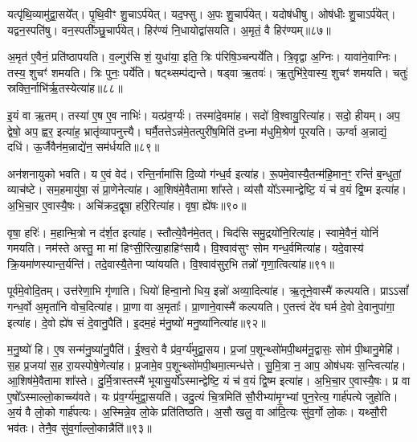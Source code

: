 यत्पृ॑थि॒व्यामु॑द्वा॒सये᳚त्। 
पृ॒थि॒वीꣳ शु॒चाऽर्प॑येत्। 
यद॒फ्सु। 
अ॒पः  शु॒चार्प॑येत्। 
यदोष॑धीषु। 
ओष॑धीः  शु॒चाऽर्प॑येत्। 
यद्वन॒स्पति॑षु। 
वन॒स्पती᳚ञ्छु॒चार्प॑येत्। 
हिर॑ण्यं नि॒धायोद्वा॑सयति। 
अ॒मृतं॒ वै हिर॑ण्यम्॥८७॥

अ॒मृत॑ ए॒वैनं॒ प्रति॑ष्ठापयति। 
व॒ल्गुर॑सि शं॒ युधा॑या॒ इति॒ त्रिः प॑रिषि॒ञ्चन्पर्ये॑ति। 
त्रि॒वृद्वा अ॒ग्निः। 
यावा॑ने॒वाग्निः। 
तस्य॒ शुचꣳ॑ शमयति। 
त्रिः पुनः॒ पर्ये॑ति। 
षट्थ्सम्प॑द्यन्ते। 
षड्वा ऋ॒तवः॑। 
ऋ॒तुभि॑रे॒वास्य॒ शुचꣳ॑ शमयति। 
चतुः॑ स्रक्ति॒र्नाभि॑र्\mbox{}ऋ॒तस्येत्या॑ह॥८८॥

इ॒यं वा ऋ॒तम्। 
तस्या॑ ए॒ष ए॒व नाभिः॑। 
यत्प्र॑व॒र्ग्यः॑। 
तस्मा॑दे॒वमा॑ह। 
सदो॑ वि॒श्वायु॒रित्या॑ह। 
सदो॒ हीयम्। 
अप॒ द्वेषो॒ अप॒ ह्वर॒ इत्या॑ह॒ भ्रातृ॑व्यापनुत्त्यै। 
घर्मै॒तत्तेऽन्न॑मे॒तत्पुरी॑ष॒मिति॑ द॒ध्ना म॑धुमि॒श्रेण॑ पूरयति। 
ऊर्ग्वा अ॒न्नाद्यं॒ दधि॑। 
ऊ॒र्जैवैन॑म॒न्नाद्ये॑न॒ सम॑र्धयति॥८९॥

अन॑शनायुको भवति। 
य ए॒वं वेद॑। 
रन्ति॒र्नामा॑सि दि॒व्यो ग॑न्ध॒र्व इत्या॑ह। 
रू॒पमे॒वास्यै॒तन्म॑हि॒मान॒ꣳ॒ रन्तिं॑ ब॒न्धुतां॒ व्याच॑ष्टे। 
सम॒हमायु॑षा॒ सं प्रा॒णेनेत्या॑ह। 
आ॒शिष॑मे॒वैतामा शा᳚स्ते। 
व्य॑सौ यो᳚ऽस्मान्द्वेष्टि॒ यं च॑ व॒यं द्वि॒ष्म इत्या॑ह। 
अ॒भि॒चा॒र ए॒वास्यै॒षः। 
अचि॑क्रद॒द्वृषा॒ हरि॒रित्या॑ह। 
वृषा॒ ह्ये॑षः॥९०॥

वृषा॒ हरिः॑। 
म॒हान्मि॒त्रो न द॑र्\mbox{}श॒त इत्या॑ह। 
स्तौत्ये॒वैन॑मे॒तत्। 
चिद॑सि समु॒द्रयो॑नि॒रित्या॑ह। 
स्वामे॒वैनं॒ योनिं॑ गमयति। 
नम॑स्ते अस्तु॒ मा मा॑ हिꣳसी॒रित्या॒हाहिꣳ॑सायै। 
वि॒श्वाव॑सुꣳ सोम गन्ध॒र्वमित्या॑ह। 
यदे॒वास्य॑ क्रि॒यमा॑ण\-स्यान्त॒र्यन्ति॑। 
तदे॒वास्यै॒तेना प्या॑ययति। 
वि॒श्वाव॑सुर॒भि तन्नो॑ गृणा॒त्वि\-त्या॑ह॥९१॥

पूर्व॑मे॒वोदि॒तम्। 
उत्त॑रेणा॒भि गृ॑णाति। 
धियो॑ हिन्वा॒नो धिय॒ इन्नो॑ अव्या॒दित्या॑ह। 
ऋ॒तूने॒वास्मै॑ कल्पयति। 
प्राऽऽसां᳚ गन्ध॒र्वो अ॒मृता॑नि वोच॒दित्या॑ह। 
प्रा॒णा वा अ॒मृताः᳚। 
प्रा॒णाने॒वास्मै॑ कल्पयति। 
ए॒तत्त्वं दे॑व घर्म दे॒वो दे॒वानुपा॑गा॒ इत्या॑ह। 
दे॒वो ह्ये॑ष सं दे॒वानु॒पैति॑। 
इ॒दम॒हं म॑नु॒ष्यो॑ मनु॒ष्या॑नित्या॑ह॥९२॥

म॒नु॒ष्यो॑ हि। 
ए॒ष सन्म॑नु॒ष्या॑नु॒पैति॑। 
ई॒श्व॒रो वै प्र॑व॒र्ग्य॑मुद्वा॒सय\sn{}। 
प्र॒जां प॒शून्थ्सो॑मपी॒थम॑नू॒द्वासः॒ सोम॑ पी॒थानु॒मेहि॑। 
स॒ह प्र॒जया॑ स॒ह रा॒यस्पोषे॒णेत्या॑ह। 
प्र॒जामे॒व प॒शून्थ्सो॑मपी॒थमा॒त्मन्ध॑त्ते। 
सु॒मि॒त्रा न॒ आप॒ ओष॑धयः स॒न्त्वित्या॑ह। 
आ॒शिष॑मे॒वैतामा शा᳚स्ते। 
दु॒र्मि॒त्रास्तस्मै॑ भूयासु॒र्यो᳚ऽस्मान्द्वेष्टि॒ यं च॑ व॒यं द्वि॒ष्म इत्या॑ह। 
अ॒भि॒चा॒र ए॒वास्यै॒षः। 
प्र वा ए॒षो᳚ऽस्माल्लो॒काच्च्य॑वते। 
यः प्र॑व॒र्ग्य॑मुद्वा॒सयति॑। 
उदु॒त्यं चि॒त्रमिति॑ सौ॒रीभ्या॑मृ॒ग्भ्यां पुन॒रेत्य॒ गार्\mbox{}ह॑पत्ये जुहोति। 
अ॒यं वै लो॒को गार्\mbox{}ह॑पत्यः। 
अ॒स्मिन्ने॒व लो॒के प्रति॑तिष्ठति। 
अ॒सौ खलु॒ वा आ॑दि॒त्यः सु॑व॒र्गो लो॒कः। 
यथ्सौ॒री भव॑तः। 
तेनै॒व सु॑व॒र्गाल्लो॒कान्नैति॑॥९३॥
\anuvakamend[ब्रह्म॑णस्त्वा पर॒स्पाया॒ इत्या॑ह दधात्य॒न्वित्य॑ रक्ष॒स्वी रक्ष॑सा॒मप॑हत्यै॒ वै हिर॑ण्यमाहार्धयति॒ ह्ये॑ष गृ॑णा॒त्वित्या॑ह मनु॒ष्या॑नित्या॑हास्यै॒षो᳚ऽष्टौ च॑]

